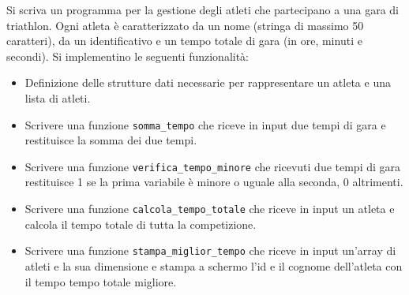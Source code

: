\begin{Exercise}[label={ex:triathlon}]
    Si scriva un programma per la gestione degli atleti che partecipano a una gara di triathlon.
    Ogni atleta è caratterizzato da un nome (stringa di massimo 50 caratteri), da un identificativo e un tempo totale di gara (in ore, minuti e secondi).
    Si implementino le seguenti funzionalità:
    \begin{itemize}
        \item Definizione delle strutture dati necessarie per rappresentare un atleta e una lista di atleti.
        \item Scrivere una funzione \texttt{somma\_tempo} che riceve in input due tempi di gara e restituisce la somma dei due tempi.
        \item Scrivere una funzione \texttt{verifica\_tempo\_minore} che ricevuti due tempi di gara restituisce 1 se la prima variabile è minore o uguale alla seconda, 0 altrimenti.
        \item Scrivere una funzione \texttt{calcola\_tempo\_totale} che riceve in input un atleta e calcola il tempo totale di tutta la competizione.
        \item Scrivere una funzione \texttt{stampa\_miglior\_tempo} che riceve in input un'array di atleti e la sua dimensione e stampa a schermo l'id e il cognome dell'atleta con il tempo tempo totale migliore.
    \end{itemize}
\end{Exercise}

\begin{Answer}[ref={ex:triathlon}]
  	
\end{Answer}
